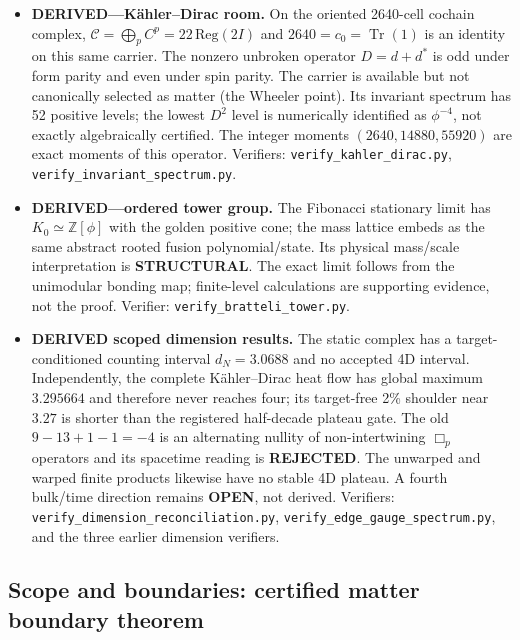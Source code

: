 \documentclass[12pt,a4paper]{article}
\theoremstyle{definition}
\begin{document}
\begin{itemize}
\item \textbf{DERIVED---K\"ahler--Dirac room.} On the oriented 2640-cell cochain complex, $\mathcal C=\bigoplus_p C^p=22\,\mathrm{Reg}(2I)$ and $2640=c_0=\operatorname{Tr}(1)$ is an identity on this same carrier.  The nonzero unbroken operator $D=d+d^*$ is odd under form parity and even under spin parity.  The carrier is available but not canonically selected as matter (the Wheeler point).  Its invariant spectrum has 52 positive levels; the lowest $D^2$ level is numerically identified as $\phi^{-4}$, not exactly algebraically certified.  The integer moments $(2640,14880,55920)$ are exact moments of this operator.  Verifiers: \texttt{verify\_kahler\_dirac.py}, \texttt{verify\_invariant\_spectrum.py}.
\item \textbf{DERIVED---ordered tower group.} The Fibonacci stationary limit has $K_0\simeq\mathbb Z[\phi]$ with the golden positive cone; the mass lattice embeds as the same abstract rooted fusion polynomial/state.  Its physical mass/scale interpretation is \textbf{STRUCTURAL}.  The exact limit follows from the unimodular bonding map; finite-level calculations are supporting evidence, not the proof.  Verifier: \texttt{verify\_bratteli\_tower.py}.
\item \textbf{DERIVED scoped dimension results.} The static complex has a target-conditioned counting interval $d_N=3.0688$ and no accepted 4D interval.  Independently, the complete K\"ahler--Dirac heat flow has global maximum $3.295664$ and therefore never reaches four; its target-free 2\% shoulder near $3.27$ is shorter than the registered half-decade plateau gate.  The old $9-13+1-1=-4$ is an alternating nullity of non-intertwining $\Box_p$ operators and its spacetime reading is \textbf{REJECTED}.  The unwarped and warped finite products likewise have no stable 4D plateau.  A fourth bulk/time direction remains \textbf{OPEN}, not derived.  Verifiers: \texttt{verify\_dimension\_reconciliation.py}, \texttt{verify\_edge\_gauge\_spectrum.py}, and the three earlier dimension verifiers.
\end{itemize}

\subsection{Scope and boundaries: certified matter boundary theorem}
\label{sec:scope_boundaries}
\end{document}
